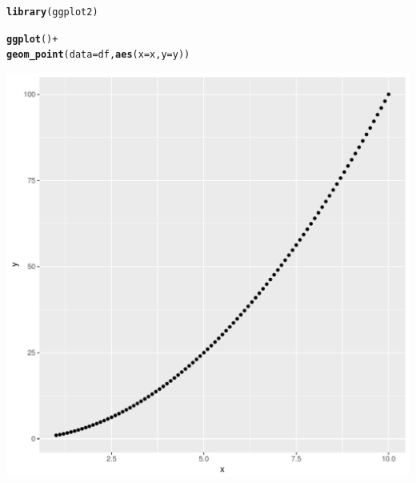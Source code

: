 \documentclass{article}\usepackage[]{graphicx}\usepackage[]{color}
\makeatletter
\def\maxwidth{ %
  \ifdim\Gin@nat@width>\linewidth
    \linewidth
  \else
    \Gin@nat@width
  \fi
}
\newcommand{\hlopt}[1]{\textcolor[rgb]{0,0,0}{#1}}%
\newcommand{\hlstd}[1]{\textcolor[rgb]{0.345,0.345,0.345}{#1}}%
\newcommand{\hlkwc}[1]{\textcolor[rgb]{0.333,0.667,0.333}{#1}}%
\newcommand{\hlkwd}[1]{\textcolor[rgb]{0.737,0.353,0.396}{\textbf{#1}}}%
\newenvironment{kframe}{%
 \def\at@end@of@kframe{}%
 \ifinner\ifhmode%
  \def\at@end@of@kframe{\end{minipage}}%
  \begin{minipage}{\columnwidth}%
 \fi\fi%
 \def\FrameCommand##1{\hskip\@totalleftmargin \hskip-\fboxsep
 \colorbox{shadecolor}{##1}\hskip-\fboxsep
     \hskip-\linewidth \hskip-\@totalleftmargin \hskip\columnwidth}%
 \MakeFramed {\advance\hsize-\width
   \@totalleftmargin\z@ \linewidth\hsize
   \@setminipage}}%
 {\par\unskip\endMakeFramed%
 \at@end@of@kframe}
\newenvironment{knitrout}{}{} %
\makeatother
\begin{document}
\begin{knitrout}
\color{fgcolor}\begin{kframe}
\begin{alltt}
\hlkwd{library}\hlstd{(ggplot2)}

\hlkwd{ggplot}\hlstd{()}\hlopt{+}
  \hlkwd{geom_point}\hlstd{(}\hlkwc{data} \hlstd{= df,} \hlkwd{aes}\hlstd{(}\hlkwc{x} \hlstd{= x,} \hlkwc{y} \hlstd{= y))}
\end{alltt}
\end{kframe}
\includegraphics[width=\maxwidth]{figure/unnamed-chunk-10-1} 

\end{knitrout}
\end{document}
